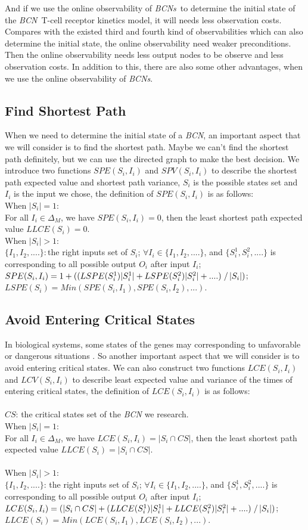 \documentclass[conference]{IEEEtran} %
\def \BCN {{\em BCN}}
\def \BCNs {{\em BCNs}}
\begin{document}
And if we use the online observability of \BCNs\ to determine the initial state of the \BCN\ T-cell receptor kinetics model, it will needs less observation costs. Compares with the existed third and fourth kind of observabilities which can also determine the initial state, the online observability need weaker preconditions. Then the online observability needs less output nodes to be observe and less observation costs. In addition to this, there are also some other advantages, when we use the online observability of {\em BCNs}.
\subsection{Find Shortest Path}
When we need to determine the initial state of a {\em BCN}, an important aspect that we will consider is to find the shortest path. Maybe we can't find the shortest path definitely, but we can use the directed graph to make the best decision. We introduce two functions $SPE(S_i, I_i)$ and $SPV(S_i, I_i)$ to describe the shortest path expected value and shortest path variance, $S_i$ is the possible states set and $I_i$ is the input we chose, the definition of $SPE(S_i, I_i)$ is as follows:\\
When $|S_i|=1$:\\ 
For all $I_i \in \Delta_M$, we have $SPE(S_i, I_i)=0$, then the least shortest path  expected value $LLCE(S_i)= 0$. \\
When $|S_i|>1$:\\ 
$\{I_1,I_2,....\}$:\,the right inputs set of $S_i$; $\forall I_i \in \{I_1,I_2,....\}$, and $\{S_i^1,S_i^2,....\}$ is corresponding to all possible output $O_i$ after input $I_i$; $SPE(S_i, I_i)=1 +( (LSPE(S_i^1)|S_i^1|+LSPE(S_i^2)|S_i^2|+....)\left. \right/ |S_i|)$; $LSPE(S_i)= Min(SPE(S_i, I_1),SPE(S_i, I_2),...)$.
\subsection{Avoid Entering Critical States}
In biological systems, some states of the genes may corresponding to unfavorable or dangerous situations \cite{Li2014Controllability}. So another important aspect that we will consider is to avoid entering critical states. We can also construct two functions $LCE(S_i, I_i)$ and $LCV(S_i, I_i)$ to describe least expected value and variance of the times of entering critical states, the definition of $LCE(S_i, I_i)$ is as follows:\\
\\$CS$: the critical states set of the {\em BCN} we research.\\
When $|S_i|=1$:\\ 
For all $I_i \in \Delta_M$, we have $LCE(S_i, I_i)=|S_i \cap CS |$, then the least shortest path  expected value $LLCE(S_i)=|S_i \cap CS |$. \\
\\
When $|S_i|>1$:\\ 
$\{I_1,I_2,....\}$: the right inputs set of $S_i$; $\forall I_i \in \{I_1,I_2,....\}$, and $\{S_i^1,S_i^2,....\}$ is corresponding to all possible output $O_i$ after input $I_i$; $LCE(S_i, I_i)=(|S_i \cap CS | + (LLCE(S_i^1)|S_i^1|+LLCE(S_i^2)|S_i^2|+....)\left. \right/ |S_i|)$; $LLCE(S_i)= Min(LCE(S_i, I_1),LCE(S_i, I_2),...)$.
\end{document}
